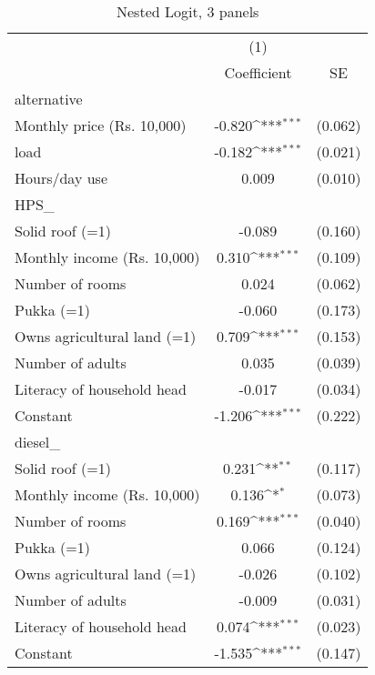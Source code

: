 \begin{table}[htbp]\centering
\def\sym#1{\ifmmode^{#1}\else\(^{#1}\)\fi}
\caption{Nested Logit, 3 panels}
\begin{tabular}{l*{1}{cc}}
\toprule
                    &\multicolumn{1}{c}{(1)}         &            \\
                    & Coefficient         &          SE\\
\midrule
alternative         &                     &            \\
Monthly price (Rs. 10,000)&      -0.820\sym{***}&     (0.062)\\
load                &      -0.182\sym{***}&     (0.021)\\
Hours/day use       &       0.009         &     (0.010)\\
\midrule
HPS\_                &                     &            \\
Solid roof (=1)     &      -0.089         &     (0.160)\\
Monthly income (Rs. 10,000)&       0.310\sym{***}&     (0.109)\\
Number of rooms     &       0.024         &     (0.062)\\
Pukka (=1)          &      -0.060         &     (0.173)\\
Owns agricultural land (=1)&       0.709\sym{***}&     (0.153)\\
Number of adults    &       0.035         &     (0.039)\\
Literacy of household head&      -0.017         &     (0.034)\\
Constant            &      -1.206\sym{***}&     (0.222)\\
\midrule
diesel\_             &                     &            \\
Solid roof (=1)     &       0.231\sym{**} &     (0.117)\\
Monthly income (Rs. 10,000)&       0.136\sym{*}  &     (0.073)\\
Number of rooms     &       0.169\sym{***}&     (0.040)\\
Pukka (=1)          &       0.066         &     (0.124)\\
Owns agricultural land (=1)&      -0.026         &     (0.102)\\
Number of adults    &      -0.009         &     (0.031)\\
Literacy of household head&       0.074\sym{***}&     (0.023)\\
Constant            &      -1.535\sym{***}&     (0.147)\\

\end{tabular}
\end{table}

